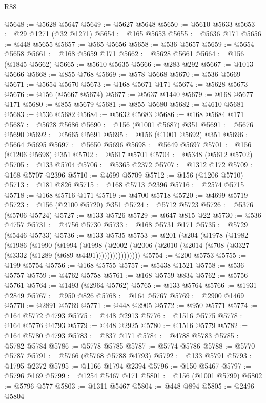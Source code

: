 \begin{lexlean}{R88}
\begin{coremodule}
@5648 := @5628 @5647
@5649 := @5627 @5648
@5650 := @5610 @5633
@5653 := @29 @1271 (@32 @1271)
@5654 := @165 @5653
@5655 := @5636 @171
@5656 := @448 @5655
@5657 := @565 @5656
@5658 := @536 @5657
@5659 := @5654 @5658
@5661 := @168 @5659 @171
@5662 := @5628 @5661
@5664 := @156 (@1845 @5662)
@5665 := @5610 @5635
@5666 := @283 @292
@5667 := @1013 @5666
@5668 := @855 @768
@5669 := @578 @5668
@5670 := @536 @5669
@5671 := @5654 @5670
@5673 := @168 @5671 @171
@5674 := @5628 @5673
@5676 := @156 (@5667 @5674)
@5677 := @5637 @1440
@5679 := @168 @5677 @171
@5680 := @855 @5679
@5681 := @855 @5680
@5682 := @4610 @5681
@5683 := @536 @5682
@5684 := @5632 @5683
@5686 := @168 @5684 @171
@5687 := @5628 @5686
@5690 := @156 (@1001 @5687) @351
@5691 := @5676 @5690
@5692 := @5665 @5691
@5695 := @156 (@1001 @5692) @351
@5696 := @5664 @5695
@5697 := @5650 @5696
@5698 := @5649 @5697
@5701 := @156 (@1206 @5698) @351
@5702 := @5617 @5701
@5704 := @5348 (@5612 @5702)
@5705 := @133 @5704
@5706 := @5365 @2372
@5707 := @1312 @172
@5709 := @168 @5707 @2396
@5710 := @4699 @5709
@5712 := @156 (@1206 @5710)
@5713 := @181 @826
@5715 := @168 @5713 @2396
@5716 := @2574 @5715
@5718 := @168 @5716 @171
@5719 := @4700 @5718
@5720 := @4699 @5719
@5723 := @156 (@2100 @5720) @351
@5724 := @5712 @5723
@5726 := @5376 (@5706 @5724)
@5727 := @133 @5726
@5729 := @647 @815 @22
@5730 := @536 @4757
@5731 := @4756 @5730
@5733 := @168 @5731 @171
@5735 := @5729 (@5446 @5733)
@5736 := @133 @5735
@5753 := @201
    (@204
      (@1978
        (@1982
          (@1986
            (@1990
              (@1994
                (@1998
                  (@2002 (@2006 (@2010 (@2014 (@708 (@3327 (@3332 (@1289 (@689 @4491))))))))))))))))
@5754 := @200 @5753
@5755 := @199 @5754
@5756 := @168 @5755
@5757 := @5438 @1521
@5758 := @536 @5757
@5759 := @4762 @5758
@5761 := @168 @5759 @834
@5762 := @5756 @5761
@5764 := @1493 (@2964 @5762)
@5765 := @133 @5764
@5766 := @1931 @2849
@5767 := @950 @826
@5768 := @164 @5767
@5769 := @2900 @1469
@5770 := @2891 @5769
@5771 := @448 @2905
@5772 := @950 @5771
@5774 := @164 @5772 @4793
@5775 := @448 @2913
@5776 := @1516 @5775
@5778 := @164 @5776 @4793
@5779 := @448 @2925
@5780 := @1516 @5779
@5782 := @164 @5780 @4793
@5783 := @837 @171
@5784 := @4788 @5783
@5785 := @5782 @5784
@5786 := @5778 @5785
@5787 := @5774 @5786
@5788 := @5770 @5787
@5791 := @5766 (@5768 @5788 @4793)
@5792 := @133 @5791
@5793 := @1795 @2372
@5795 := @1166 @1794 @2394
@5796 := @150 @5467
@5797 := @5796 @169
@5799 := @1254 @5467 @171
@5801 := @156 (@1001 @5799)
@5802 := @5796 @577
@5803 := @1311 @5467
@5804 := @448 @894
@5805 := @2496 @5804

\end{coremodule}
\end{lexlean}
